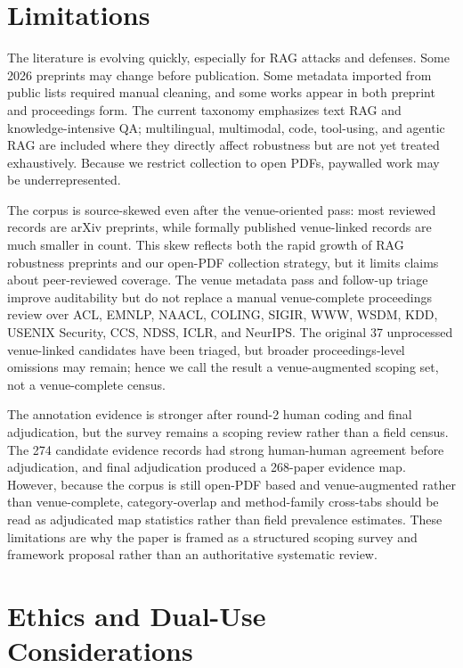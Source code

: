 \documentclass[11pt]{article}
\begin{document}
\section{Limitations}
\label{sec:limitations}

The literature is evolving quickly, especially for RAG attacks and defenses. Some 2026 preprints may change before publication. Some metadata imported from public lists required manual cleaning, and some works appear in both preprint and proceedings form. The current taxonomy emphasizes text RAG and knowledge-intensive QA; multilingual, multimodal, code, tool-using, and agentic RAG are included where they directly affect robustness but are not yet treated exhaustively. Because we restrict collection to open PDFs, paywalled work may be underrepresented.

The corpus is source-skewed even after the venue-oriented pass: most reviewed records are arXiv preprints, while formally published venue-linked records are much smaller in count. This skew reflects both the rapid growth of RAG robustness preprints and our open-PDF collection strategy, but it limits claims about peer-reviewed coverage. The venue metadata pass and follow-up triage improve auditability but do not replace a manual venue-complete proceedings review over ACL, EMNLP, NAACL, COLING, SIGIR, WWW, WSDM, KDD, USENIX Security, CCS, NDSS, ICLR, and NeurIPS. The original 37 unprocessed venue-linked candidates have been triaged, but broader proceedings-level omissions may remain; hence we call the result a venue-augmented scoping set, not a venue-complete census.

The annotation evidence is stronger after round-2 human coding and final adjudication, but the survey remains a scoping review rather than a field census. The 274 candidate evidence records had strong human-human agreement before adjudication, and final adjudication produced a 268-paper evidence map. However, because the corpus is still open-PDF based and venue-augmented rather than venue-complete, category-overlap and method-family cross-tabs should be read as adjudicated map statistics rather than field prevalence estimates. These limitations are why the paper is framed as a structured scoping survey and framework proposal rather than an authoritative systematic review.

\section{Ethics and Dual-Use Considerations}
\label{sec:ethics}
\end{document}
